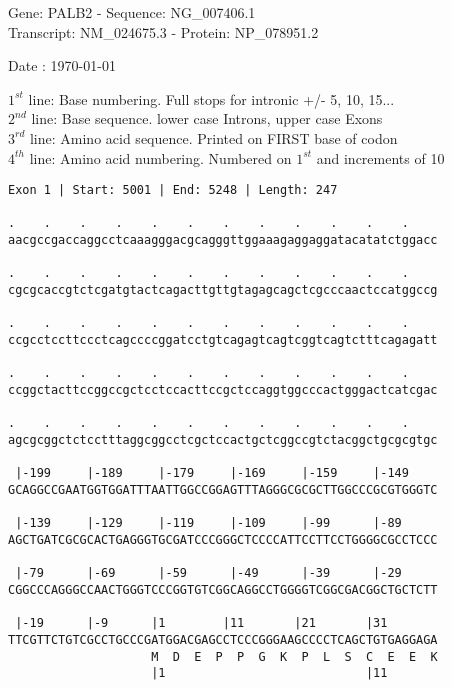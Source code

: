 \documentclass{article}
\begin{document}
\begin{center}
\begin{large}
Gene: PALB2 - Sequence: NG\_007406.1\\
Transcript: NM\_024675.3 - Protein: NP\_078951.2
 
 Date : \today
\end{large}
\end{center}
$1^{st}$ line: Base numbering. Full stops for intronic +/- 5, 10, 15...\\
$2^{nd}$ line: Base sequence. lower case Introns, upper case Exons\\
$3^{rd}$ line: Amino acid sequence. Printed on FIRST base of codon\\
$4^{th}$ line: Amino acid numbering. Numbered on $1^{st}$ and increments of 10\\
\begin{Verbatim}
Exon 1 | Start: 5001 | End: 5248 | Length: 247
 
.    .    .    .    .    .    .    .    .    .    .    .    
aacgccgaccaggcctcaaagggacgcagggttggaaagaggaggatacatatctggacc
  
.    .    .    .    .    .    .    .    .    .    .    .    
cgcgcaccgtctcgatgtactcagacttgttgtagagcagctcgcccaactccatggccg
  
.    .    .    .    .    .    .    .    .    .    .    .    
ccgcctccttccctcagccccggatcctgtcagagtcagtcggtcagtctttcagagatt
  
.    .    .    .    .    .    .    .    .    .    .    .    
ccggctacttccggccgctcctccacttccgctccaggtggcccactgggactcatcgac
  
.    .    .    .    .    .    .    .    .    .    .    .    
agcgcggctctcctttaggcggcctcgctccactgctcggccgtctacggctgcgcgtgc
  
 |-199     |-189     |-179     |-169     |-159     |-149    
GCAGGCCGAATGGTGGATTTAATTGGCCGGAGTTTAGGGCGCGCTTGGCCCGCGTGGGTC
  
 |-139     |-129     |-119     |-109     |-99      |-89     
AGCTGATCGCGCACTGAGGGTGCGATCCCGGGCTCCCCATTCCTTCCTGGGGCGCCTCCC
  
 |-79      |-69      |-59      |-49      |-39      |-29     
CGGCCCAGGGCCAACTGGGTCCCGGTGTCGGCAGGCCTGGGGTCGGCGACGGCTGCTCTT
  
 |-19      |-9      |1        |11       |21       |31       
TTCGTTCTGTCGCCTGCCCGATGGACGAGCCTCCCGGGAAGCCCCTCAGCTGTGAGGAGA
                    M  D  E  P  P  G  K  P  L  S  C  E  E  K
                    |1                            |11       
  

\end{Verbatim}
\end{document}

